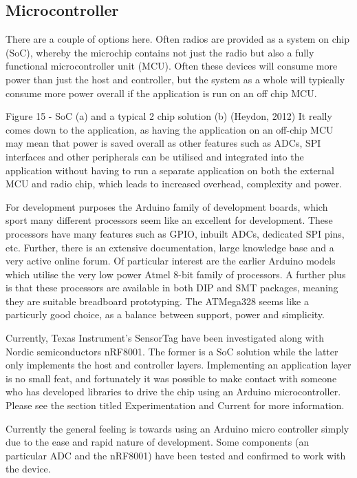 \documentclass[]{article}
\begin{document}
\subsection{Microcontroller}
There are a couple of options here. Often radios are provided as a system on chip (SoC), whereby the microchip contains not just the radio but also a fully functional microcontroller unit (MCU). Often these devices will consume more power than just the host and controller, but the system as a whole will typically consume more power overall if the application is run on an off chip MCU. 
 
Figure 15 - SoC (a) and a typical 2 chip solution (b) (Heydon, 2012)
It really comes down to the application, as having the application on an off-chip MCU may mean that power is saved overall as other features such as ADCs, SPI interfaces and other peripherals can be utilised and integrated into the application without having to run a separate application on both the external MCU and radio chip, which leads to increased overhead, complexity and power. 

For development purposes the Arduino family of development boards, which sport many different processors seem like an excellent for development. These processors have many features such as GPIO, inbuilt ADCs, dedicated SPI pins, etc. Further, there is an extensive documentation, large knowledge base and a very active online forum. Of particular interest are the earlier Arduino models which utilise the very low power Atmel 8-bit family of processors. A further plus is that these processors are available in both DIP and SMT packages, meaning they are suitable breadboard prototyping. The ATMega328 seems like a particurly good choice, as a balance between support, power and simplicity. 

Currently, Texas Instrument’s SensorTag have been investigated along with Nordic semiconductors nRF8001. The former is a SoC solution while the latter only implements the host and controller layers. Implementing an application layer is no small feat, and fortunately it was possible to make contact with someone who has developed libraries to drive the chip using an Arduino microcontroller. Please see the section titled Experimentation and Current  for more information.

Currently the general feeling is towards using an Arduino micro controller simply due to the ease and rapid nature of development. Some components (an particular ADC and the nRF8001) have been tested and confirmed to work with the device.
\end{document}
